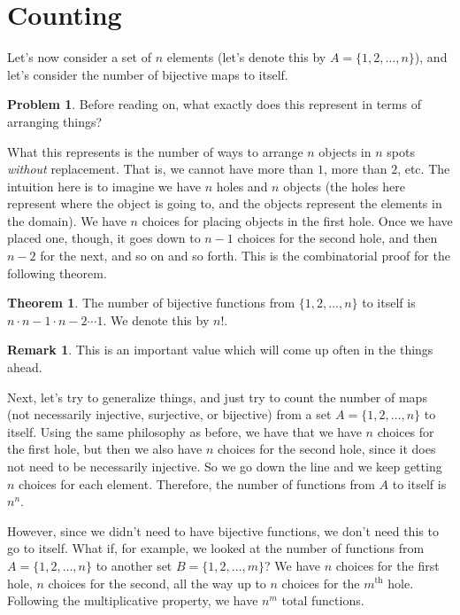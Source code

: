 \documentclass{book}
\theoremstyle{definition}
\newtheorem{problem}{Problem}
\numberwithin{problem}{chapter}
\numberwithin{solution}{chapter}
\newtheorem{theorem}{Theorem}
\numberwithin{theorem}{chapter}
\numberwithin{definition}{chapter}
\numberwithin{example}{chapter}
\newtheorem{remark}{Remark}
\numberwithin{remark}{chapter}
\numberwithin{claim}{chapter}
\numberwithin{fact}{chapter}
\numberwithin{preliminary}{chapter}
\numberwithin{corollary}{theorem}
\numberwithin{lemma}{chapter}
\numberwithin{proposition}{chapter}
\begin{document}
\section{Counting}

Let's now consider a set of $n$ elements (let's denote this by $A = \{1, 2, \ldots, n\}$), and let's consider the number of bijective maps to itself. 

\begin{problem}
Before reading on, what exactly does this represent in terms of arranging things?
\end{problem}

What this represents is the number of ways to arrange $n$ objects in $n$ spots \textit{without} replacement. That is, we cannot have more than $1$, more than $2$, etc. The intuition here is to imagine we have $n$ holes and $n$ objects (the holes here represent where the object is going to, and the objects represent the elements in the domain). We have $n$ choices for placing objects in the first hole. Once we have placed one, though, it goes down to $n-1$ choices for the second hole, and then $n-2$ for the next, and so on and so forth. This is the combinatorial proof for the following theorem.

\begin{theorem}
The number of bijective functions from $\{1,2,\ldots,n\}$ to itself is $n \cdot n-1 \cdot n-2 \cdots 1$. We denote this by $n!$.
\end{theorem}

\begin{remark}
This is an important value which will come up often in the things ahead. 
\end{remark}

Next, let's try to generalize things, and just try to count the number of maps (not necessarily injective, surjective, or bijective) from a set $A = \{1, 2, \ldots, n\}$ to itself. Using the same philosophy as before, we have that we have $n$ choices for the first hole, but then we also have $n$ choices for the second hole, since it does not need to be necessarily injective. So we go down the line and we keep getting $n$ choices for each element. Therefore, the number of functions from $A$ to itself is $n^n$.

However, since we didn't need to have bijective functions, we don't need this to go to itself. What if, for example, we looked at the number of functions from $A = \{1, 2, \ldots, n\}$ to another set $B = \{1, 2, \ldots, m\}$? We have $n$ choices for the first hole, $n$ choices for the second, all the way up to $n$ choices for the $m^\text{th}$ hole. Following the multiplicative property, we have $n^m$ total functions.
\end{document}
